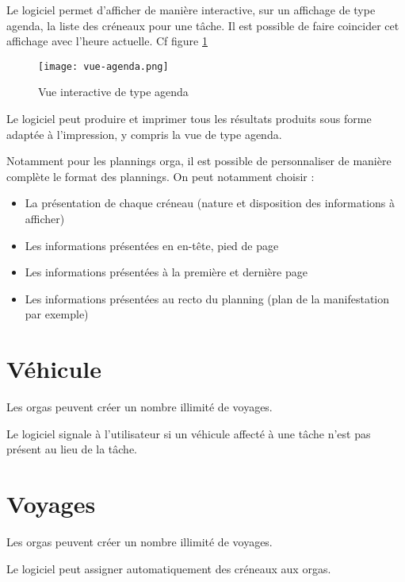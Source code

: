 Le logiciel permet d'afficher de manière interactive, sur un affichage de type agenda, la liste des créneaux pour une tâche. Il est possible de faire coincider cet affichage avec l'heure actuelle.
Cf figure \ref{fig:agenda}

\begin{figure}[h!t]
\centering
\texttt{[image: vue-agenda.png]}

\caption{Vue interactive de type agenda}
\label{fig:agenda}
\end{figure}


Le logiciel peut produire et imprimer tous les résultats produits sous forme adaptée à l'impression, y compris la vue de type agenda.


Notamment pour les plannings orga, il est possible de personnaliser de manière complète le format des plannings. On peut notamment choisir :
\begin{itemize}
 \item La présentation de chaque créneau (nature et disposition des informations à afficher)
\item Les informations présentées en en-tête, pied de page
\item Les informations présentées à la première et dernière page
\item Les informations présentées au recto du planning (plan de la manifestation par exemple)
\end{itemize}

\section{Véhicule}

Les orgas peuvent créer un nombre illimité de voyages.


Le logiciel signale à l'utilisateur si un véhicule affecté à une tâche n'est pas présent au lieu de la tâche.





\section{Voyages}

Les orgas peuvent créer un nombre illimité de voyages.

Le logiciel peut assigner automatiquement des créneaux aux orgas.

